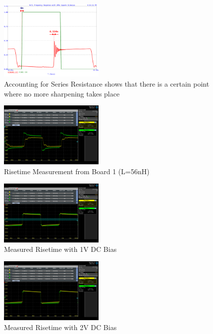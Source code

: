 \documentclass[journal]{IEEEtran} \usepackage[english]{babel}
\begin{document}
\begin{figure}[htb]
\centering
\includegraphics[width=0.45\textwidth]{Probed_Input_N10_N240_With_SeriesResistance}
\caption{Accounting for Series Resistance shows that there is a certain point where no more sharpening takes place}
\label{fig:probedWithResistance}
\end{figure}


\begin{figure}[htb]
\centering
\includegraphics[width=0.45\textwidth]{MeasuredSquareResponseB1.png}
\caption{Risetime Measurement from Board 1 (L=56nH)}
\label{fig:MeasuredSquareGeneric}
\end{figure}

\begin{figure}[htb]
\centering
\includegraphics[width=0.45\textwidth]{MeasuredSquare1VBiasB1.png}
\caption{Measured Risetime with 1V DC Bias}
\label{fig:MeasuredSquare1VBiasB1}
\end{figure}

\begin{figure}[htb]
\centering
\includegraphics[width=0.45\textwidth]{MeasuredSquare2VBiasB1.png}
\caption{Measured Risetime with 2V DC Bias}
\label{fig:MeasSquare2VBiasB1}
\end{figure}
\end{document}
